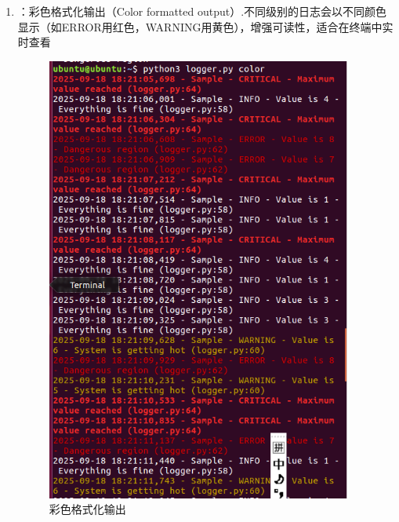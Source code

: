 \documentclass[UTF8]{ctexart}
\begin{document}
\begin{enumerate}
    \item ：彩色格式化输出（Color formatted output）.不同级别的日志会以不同颜色显示（如ERROR用红色，WARNING用黄色），增强可读性，适合在终端中实时查看
    \begin{figure}[H]
    \centering
    \includegraphics[width=0.95\textwidth]{picture/4.png}
    \caption{彩色格式化输出}
\end{figure}

\end{enumerate}
\end{document}
